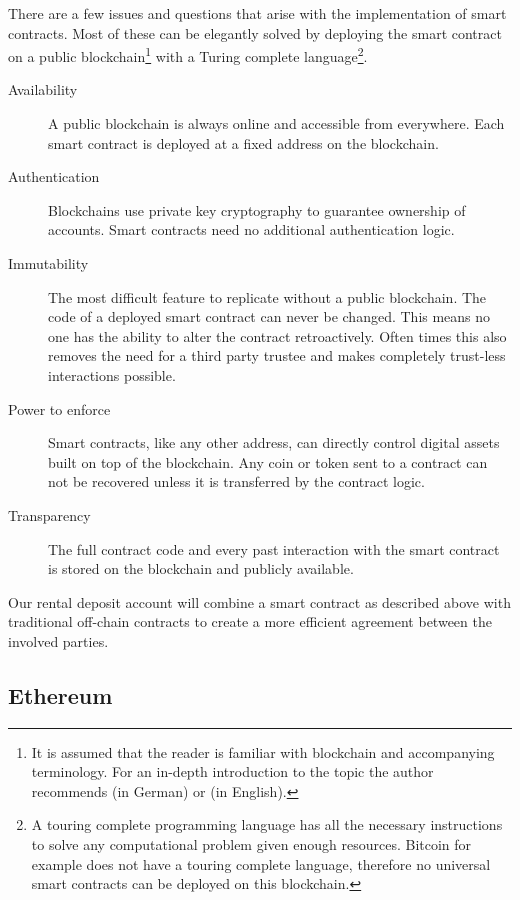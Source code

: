 \documentclass[12pt,a4paper,titlepage,oneside,english]{article}
\begin{document}
There are a few issues and questions that arise with the implementation of smart contracts. Most of these can be elegantly solved by deploying the smart contract on a public blockchain\footnote{It is assumed that the reader is familiar with blockchain and accompanying terminology. For an in-depth introduction to the topic the author recommends \cite{Schaer2017} (in German) or \cite{Lewis2018} (in English).} with a Turing complete language\footnote{A touring complete programming language has all the necessary instructions to solve any computational problem given enough resources. Bitcoin for example does not have a touring complete language, therefore no universal smart contracts can be deployed on this blockchain.}.


\begin{description}
	\item[Availability] A public blockchain is always online and accessible from everywhere. Each smart contract is deployed at a fixed address on the blockchain.
	\item[Authentication] Blockchains use private key cryptography to guarantee ownership of accounts. Smart contracts need no additional authentication logic.
	\item[Immutability] The most difficult feature to replicate without a public blockchain. The code of a deployed smart contract can never be changed. This means no one has the ability to alter the contract retroactively. Often times this also removes the need for a third party trustee and makes completely trust-less interactions possible.
	\item[Power to enforce] Smart contracts, like any other address, can directly control digital assets built on top of the blockchain. Any coin or token sent to a contract can not be recovered  unless it is transferred by the contract logic.
	\item[Transparency] The full contract code and every past interaction with the smart contract is stored on the blockchain and publicly available.
\end{description}

Our rental deposit account will combine a smart contract as described above with traditional off-chain contracts to create a more efficient agreement between the involved parties.

\subsection{Ethereum}
\label{sub:ethereum}
\end{document}
